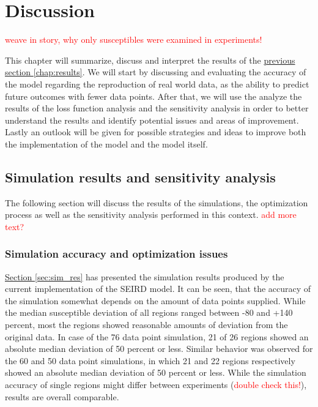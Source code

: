 
\chapter{Discussion} %
\label{chap:discussion} %
\textcolor{red}{weave in story, why only susceptibles were examined in experiments!}

This chapter will summarize, discuss and interpret the results of the \hyperref[chap:results]{previous section
\ref*{chap:results}}. We will start by discussing and evaluating the accuracy of the model regarding the reproduction
of real world data, as the ability to predict future outcomes with fewer data points. After that, we will use the
analyze the results of the loss function analysis and the sensitivity analysis in order to better understand the results
and identify potential issues and areas of improvement. Lastly an outlook will be given for possible strategies and
ideas to improve both the implementation of the model and the model itself.

\section{Simulation results and sensitivity analysis}
The following section will discuss the results of the simulations, the optimization process as well as the sensitivity
analysis performed in this context.
\textcolor{red}{add more text?}


\subsection{Simulation accuracy and optimization issues}
\hyperref[sec:sim_res]{Section \ref*{sec:sim_res}} has presented the simulation results produced by the current implementation
of the SEIRD model. It can be seen, that the accuracy of the simulation somewhat depends on the amount of data points supplied.
While the median susceptible deviation of all regions ranged between -80 and +140 percent, most the regions showed reasonable
amounts of deviation from the original data. In case of the 76 data point simulation, 21 of 26 regions showed an
absolute median deviation of 50 percent or less. Similar behavior was observed for the 60 and 50 data point simulations, in which
21 and 22 regions respectively showed an absolute median deviation of 50 percent or less. While the simulation accuracy of single regions
might differ between experiments (\textcolor{red}{double check this!}), results are overall comparable.\newline


